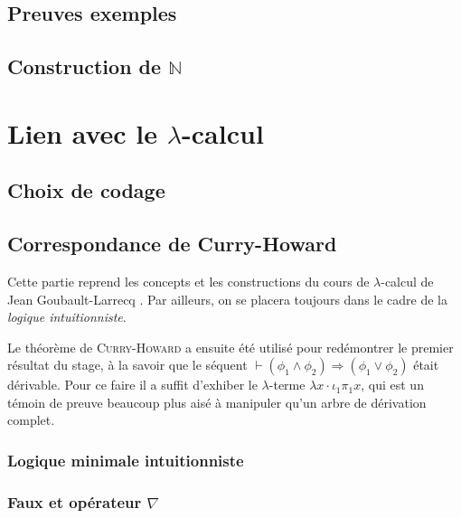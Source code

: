 \documentclass[a4paper]{article}
\newcommand{\N}{\ensuremath{\mathbb{N}}}
\theoremstyle{remark}
\theoremstyle{remark}
\theoremstyle{remark}
\theoremstyle{definition}
\theoremstyle{definition}
\theoremstyle{definition}
\begin{document}

\subsection{Preuves exemples}

\subsection{Construction de $\N$}



\section{Lien avec le $\lambda$-calcul}

\subsection{Choix de codage}


\subsection{Correspondance de {\sc Curry-Howard}}

Cette partie reprend les concepts et les constructions du cours de $\lambda$-calcul de Jean Goubault-Larrecq \cite{polylam}. Par ailleurs, on se placera toujours dans le cadre de la \emph{logique intuitionniste}.

Le théorème de \textsc{Curry-Howard} a ensuite été utilisé pour redémontrer le premier résultat du stage, à la savoir que le séquent $\vdash (\phi_1 \wedge \phi_2) \Rightarrow (\phi_1 \vee \phi_2)$ était dérivable. Pour ce faire il a suffit d'exhiber le $\lambda$-terme $\lambda x \cdot \iota_1 \pi_1 x$, qui est un témoin de preuve beaucoup plus aisé à manipuler qu'un arbre de dérivation complet.

\subsubsection{Logique minimale intuitionniste}

\subsubsection{Faux et opérateur $\nabla$}

\end{document}
